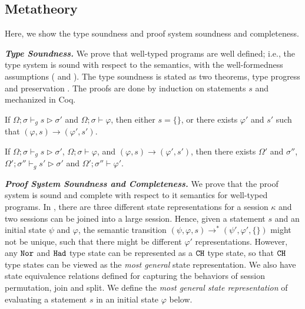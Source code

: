 \subsection{\qafny Metatheory}\label{sec:theorems}

Here, we show the type soundness and proof system soundness and completeness.

\noindent\textbf{\textit{Type Soundness.}}
We prove that well-typed \qafny programs are well defined; i.e., the
type system is sound with respect to the semantics, with the well-formedness assumptions ( and ).
The \qafny type soundness is stated as two theorems, type progress and preservation . The proofs are done by induction on statements $s$ and mechanized in Coq.

\begin{theorem}\label{thm:type-progress-oqasm}\rm 
If $\Omega;\sigma \vdash_g s \triangleright \sigma'$ and $\Omega;\sigma \vdash \varphi$, then either $s=\{\}$, or there exists $\varphi'$ and $s'$ such that $(\varphi,s)\longrightarrow (\varphi',s')$.
\end{theorem}

\begin{theorem}\label{thm:type-preservation-oqasm}\rm 
If $\Omega;\sigma \vdash_g s \triangleright \sigma'$, $\Omega;\sigma \vdash \varphi$, and $(\varphi,s)\longrightarrow (\varphi',s')$, then 
there exists $\Omega'$ and $\sigma''$, $\Omega';\sigma'' \vdash_g s' \triangleright \sigma'$ and $\Omega';\sigma'' \vdash \varphi'$.
\end{theorem}

\noindent\textbf{\textit{Proof System Soundness and Completeness.}}
We prove that the \qafny proof system is sound and complete with respect to it semantics for well-typed \qafny programs.
In \qafny, there are three different state representations for a session $\kappa$ and two sessions can be joined into a large session.
Hence, given a statement $s$ and an initial state $\psi$ and $\varphi$, the semantic transition $(\psi, \varphi,s) \longrightarrow^{*} (\psi',\varphi',\{\})$ might not be unique, such that there might be different $\varphi'$ representations.
However, any $\texttt{Nor}$ and $\texttt{Had}$ type state can be represented as a $\texttt{CH}$ type state, so that $\texttt{CH}$ type states can be viewed as the \emph{most general} state representation. We also have state equivalence relations defined for capturing the behaviors of session permutation, join and split. We define the \emph{most general state representation} of evaluating a statement $s$ in an initial state $\varphi$ below.

